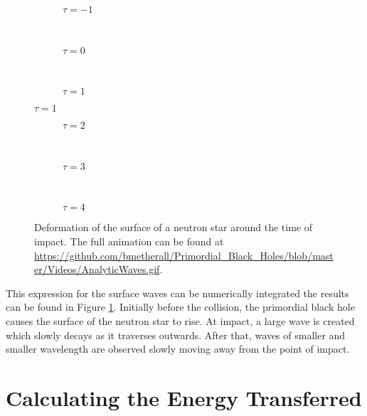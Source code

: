 \begin{figure}[p]
\begin{centering}
 \begin{subfigure}{\textwidth}
  
  \caption{$\tau = -1$}
 \end{subfigure} \\
 \begin{subfigure}{\textwidth}
  
  \caption{$\tau = 0$}
 \end{subfigure} \\
 \begin{subfigure}{\textwidth}
  
  \caption{$\tau = 1$}
 \end{subfigure}
\end{centering}
\end{figure}

\begin{figure}[p] \ContinuedFloat
\begin{centering}
 \begin{subfigure}{\textwidth}
  
  \caption{$\tau = 2$}
 \end{subfigure} \\
 \begin{subfigure}{\textwidth}
  
  \caption{$\tau = 3$}
 \end{subfigure} \\
  \begin{subfigure}{\textwidth}
  
  \caption{$\tau = 4$}
 \end{subfigure}
 \end{centering}
 \caption[Analytic Deformation of the Neutron Star]{Deformation of the surface of a neutron star around the time of impact. The full animation can be found at \url{https://github.com/bmetherall/Primordial_Black_Holes/blob/master/Videos/AnalyticWaves.gif}.}
 \label{fig:eta}
\end{figure}

This expression for the surface waves can be numerically integrated the results can be found in Figure \ref{fig:eta}. Initially before the collision, the primordial black hole causes the surface of the neutron star to rise. At impact, a large wave is created which slowly decays as it traverses outwards. After that, waves of smaller and smaller wavelength are observed slowly moving away from the point of impact.

\section{Calculating the Energy Transferred}
\label{chap:energy}

